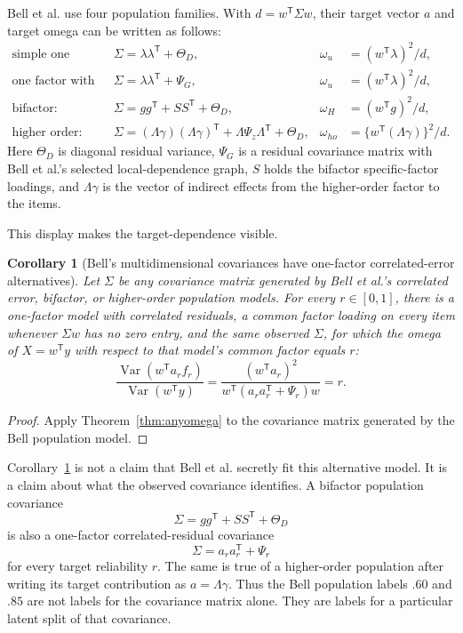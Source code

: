 \documentclass[11pt]{article}
\newcommand{\Var}{\operatorname{Var}}
\newcommand{\T}{^{\mathsf T}}
\theoremstyle{plain}
\newtheorem{corollary}{Corollary}
\theoremstyle{remark}
\begin{document}
Bell et al. use four population families. With \(d=w\T\Sigma w\), their target
vector \(a\) and target omega can be written as follows:
\[
\begin{aligned}
  \text{simple one factor:}\quad
  &\Sigma=\lambda\lambda\T+\Theta_D,
  &\omega_u&=(w\T\lambda)^2/d,\\
  \text{one factor with correlated errors:}\quad
  &\Sigma=\lambda\lambda\T+\Psi_G,
  &\omega_u&=(w\T\lambda)^2/d,\\
  \text{bifactor:}\quad
  &\Sigma=g g\T+SS\T+\Theta_D,
  &\omega_H&=(w\T g)^2/d,\\
  \text{higher order:}\quad
  &\Sigma=(\Lambda\gamma)(\Lambda\gamma)\T
    +\Lambda\Psi_z\Lambda\T+\Theta_D,
  &\omega_{ho}&=\{w\T(\Lambda\gamma)\}^2/d .
\end{aligned}
\]
Here \(\Theta_D\) is diagonal residual variance, \(\Psi_G\) is a residual
covariance matrix with Bell et al.'s selected local-dependence graph, \(S\) holds
the bifactor specific-factor loadings, and \(\Lambda\gamma\) is the vector of
indirect effects from the higher-order factor to the items.

This display makes the target-dependence visible.

\begin{corollary}[Bell's multidimensional covariances have one-factor
correlated-error alternatives]
\label{cor:bell}
Let \(\Sigma\) be any covariance matrix generated by Bell et al.'s correlated
error, bifactor, or higher-order population models. For every \(r\in[0,1]\),
there is a one-factor model with correlated residuals, a common factor loading
on every item whenever \(\Sigma w\) has no zero entry, and the same observed
\(\Sigma\), for which the omega of \(X=w\T y\) with respect to that model's
common factor equals \(r\):
\[
  \frac{\Var(w\T a_r f_r)}{\Var(w\T y)}
  =
  \frac{(w\T a_r)^2}{w\T(a_r a_r\T+\Psi_r)w}
  =
  r .
\]
\end{corollary}

\begin{proof}
Apply Theorem~\ref{thm:anyomega} to the covariance matrix generated by the Bell
population model.
\end{proof}

Corollary~\ref{cor:bell} is not a claim that Bell et al. secretly fit this
alternative model. It is a claim about what the observed covariance identifies.
A bifactor population covariance
\[
  \Sigma=g g\T+SS\T+\Theta_D
\]
is also a one-factor correlated-residual covariance
\[
  \Sigma=a_r a_r\T+\Psi_r
\]
for every target reliability \(r\). The same is true of a higher-order
population after writing its target contribution as \(a=\Lambda\gamma\). Thus
the Bell population labels \(.60\) and \(.85\) are not labels for the covariance
matrix alone. They are labels for a particular latent split of that covariance.
\end{document}
